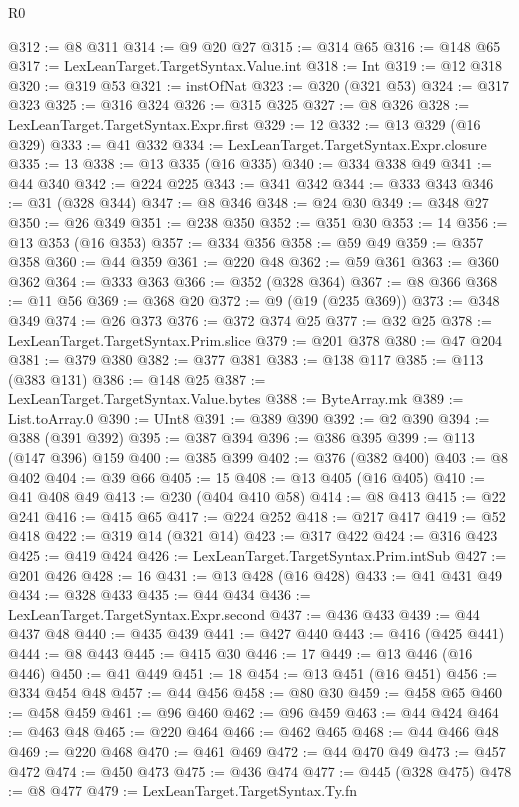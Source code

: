 \begin{lexlean}{R0}
\begin{coremodule}
{{{{{{{{{{{{{{{{{{{{{{{{{{{{{{{{{{{{{{{{{{{{{{{{{{{{{{{{{{{{{{{{{{{{{{{{{@312 := @8 @311
@314 := @9 @20 @27
@315 := @314 @65
@316 := @148 @65
@317 := LexLeanTarget.TargetSyntax.Value.int
@318 := Int
@319 := @12 @318
@320 := @319 @53
@321 := instOfNat
@323 := @320 (@321 @53)
@324 := @317 @323
@325 := @316 @324
@326 := @315 @325
@327 := @8 @326
@328 := LexLeanTarget.TargetSyntax.Expr.first
@329 := 12
@332 := @13 @329 (@16 @329)
@333 := @41 @332
@334 := LexLeanTarget.TargetSyntax.Expr.closure
@335 := 13
@338 := @13 @335 (@16 @335)
@340 := @334 @338 @49
@341 := @44 @340
@342 := @224 @225
@343 := @341 @342
@344 := @333 @343
@346 := @31 (@328 @344)
@347 := @8 @346
@348 := @24 @30
@349 := @348 @27
@350 := @26 @349
@351 := @238 @350
@352 := @351 @30
@353 := 14
@356 := @13 @353 (@16 @353)
@357 := @334 @356
@358 := @59 @49
@359 := @357 @358
@360 := @44 @359
@361 := @220 @48
@362 := @59 @361
@363 := @360 @362
@364 := @333 @363
@366 := @352 (@328 @364)
@367 := @8 @366
@368 := @11 @56
@369 := @368 @20
@372 := @9 (@19 (@235 @369))
@373 := @348 @349
@374 := @26 @373
@376 := @372 @374 @25
@377 := @32 @25
@378 := LexLeanTarget.TargetSyntax.Prim.slice
@379 := @201 @378
@380 := @47 @204
@381 := @379 @380
@382 := @377 @381
@383 := @138 @117
@385 := @113 (@383 @131)
@386 := @148 @25
@387 := LexLeanTarget.TargetSyntax.Value.bytes
@388 := ByteArray.mk
@389 := List.toArray.{0}
@390 := UInt8
@391 := @389 @390
@392 := @2 @390
@394 := @388 (@391 @392)
@395 := @387 @394
@396 := @386 @395
@399 := @113 (@147 @396) @159
@400 := @385 @399
@402 := @376 (@382 @400)
@403 := @8 @402
@404 := @39 @66
@405 := 15
@408 := @13 @405 (@16 @405)
@410 := @41 @408 @49
@413 := @230 (@404 @410 @58)
@414 := @8 @413
@415 := @22 @241
@416 := @415 @65
@417 := @224 @252
@418 := @217 @417
@419 := @52 @418
@422 := @319 @14 (@321 @14)
@423 := @317 @422
@424 := @316 @423
@425 := @419 @424
@426 := LexLeanTarget.TargetSyntax.Prim.intSub
@427 := @201 @426
@428 := 16
@431 := @13 @428 (@16 @428)
@433 := @41 @431 @49
@434 := @328 @433
@435 := @44 @434
@436 := LexLeanTarget.TargetSyntax.Expr.second
@437 := @436 @433
@439 := @44 @437 @48
@440 := @435 @439
@441 := @427 @440
@443 := @416 (@425 @441)
@444 := @8 @443
@445 := @415 @30
@446 := 17
@449 := @13 @446 (@16 @446)
@450 := @41 @449
@451 := 18
@454 := @13 @451 (@16 @451)
@456 := @334 @454 @48
@457 := @44 @456
@458 := @80 @30
@459 := @458 @65
@460 := @458 @459
@461 := @96 @460
@462 := @96 @459
@463 := @44 @424
@464 := @463 @48
@465 := @220 @464
@466 := @462 @465
@468 := @44 @466 @48
@469 := @220 @468
@470 := @461 @469
@472 := @44 @470 @49
@473 := @457 @472
@474 := @450 @473
@475 := @436 @474
@477 := @445 (@328 @475)
@478 := @8 @477
@479 := LexLeanTarget.TargetSyntax.Ty.fn
}}}}}}}}}}}}}}}}}}}}}}}}}}}}}}}}}}}}}}}}}}}}}}}}}}}}}}}}}}}}}}}}}}}}}}}}}
\end{coremodule}
\end{lexlean}

